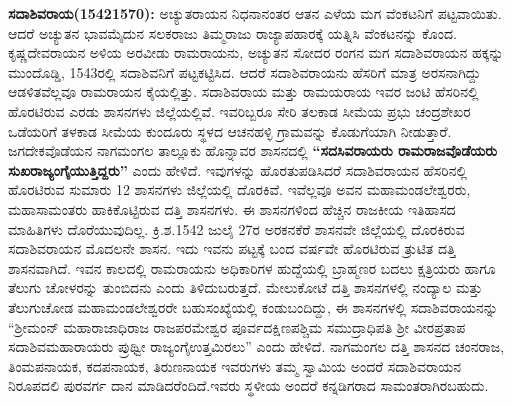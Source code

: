 \textbf{ಸದಾಶಿವರಾಯ(1542\general{\enginline{-}}1570):} ಅಚ್ಯುತರಾಯನ ನಿಧನಾನಂತರ ಆತನ ಎಳೆಯ ಮಗ ವೆಂಕಟನಿಗೆ ಪಟ್ಟವಾಯಿತು. ಆದರೆ ಅಚ್ಯುತನ ಭಾವಮೈದುನ ಸಲಕರಾಜು ತಿಮ್ಮರಾಜು ರಾಜ್ಯಾಪಹಾರಕ್ಕೆ ಯತ್ನಿಸಿ ವೆಂಕಟನನ್ನು ಕೊಂದ. ಕೃಷ್ಣದೇವರಾಯನ ಅಳಿಯ ಅರವೀಡು ರಾಮರಾಯನು, ಅಚ್ಯುತನ ಸೋದರ ರಂಗನ ಮಗ ಸದಾಶಿವರಾಯನ ಹಕ್ಕನ್ನು ಮುಂದೊಡ್ಡಿ, 1543ರಲ್ಲಿ ಸದಾಶಿವನಿಗೆ ಪಟ್ಟಕಟ್ಟಿಸಿದ. ಆದರೆ ಸದಾಶಿವರಾಯನು ಹೆಸರಿಗೆ ಮಾತ್ರ ಅರಸನಾಗಿದ್ದು ಆಡಳಿತವೆಲ್ಲವೂ ರಾಮರಾಯನ ಕೈಯಲ್ಲಿತ್ತು. ಸದಾಶಿವರಾಯ ಮತ್ತು ರಾಮಯರಾಯ ಇವರ ಜಂಟಿ ಹೆಸರಿನಲ್ಲಿ ಹೊರಟಿರುವ ಎರಡು ಶಾಸನಗಳು ಜಿಲ್ಲೆಯಲ್ಲಿವೆ. ಇವರಿಬ್ಬರೂ ಸೇರಿ ತಲಕಾಡ ಸೀಮೆಯ ಪ್ರಭು ಚಂದ್ರಶೇಖರ ಒಡೆಯರಿಗೆ ತಳಕಾಡ ಸೀಮೆಯ ಕುಂದೂರು ಸ್ಥಳದ ಆಚನಹಳ್ಳಿ ಗ್ರಾಮವನ್ನು ಕೊಡುಗೆಯಾಗಿ ನೀಡುತ್ತಾರೆ. ಜಗದೇಕವೊಡೆಯನ ನಾಗಮಂಗಲ ತಾಲ್ಲೂಕು ಹೊನ್ನಾವರ ಶಾಸನದಲ್ಲಿ \textbf{“ಸದಸಿವರಾಯರು ರಾಮರಾಜವೊಡೆಯರು ಸುಖರಾಜ್ಯಂಗೈಯುತ್ತಿದ್ದರು” }ಎಂದು ಹೇಳಿದೆ. ಇವುಗಳನ್ನು ಹೊರತುಪಡಿಸಿದರೆ ಸದಾಶಿವರಾಯನ ಹೆಸರಿನಲ್ಲಿ ಹೊರಟಿರುವ ಸುಮಾರು 12 ಶಾಸನಗಳು ಜಿಲ್ಲೆಯಲ್ಲಿ ದೊರಕಿವೆ. ಇವೆಲ್ಲವೂ ಅವನ ಮಹಾಮಂಡಲೇಶ್ವರರು, ಮಹಾಸಾಮಂತರು ಹಾಕಿಕೊಟ್ಟಿರುವ ದತ್ತಿ ಶಾಸನಗಳು. ಈ ಶಾಸನಗಳಿಂದ ಹೆಚ್ಚಿನ ರಾಜಕೀಯ ಇತಿಹಾಸದ ಮಾಹಿತಿಗಳು ದೊರೆಯುವುದಿಲ್ಲ. ಕ್ರಿ.ಶ.1542 ಜುಲೈ 27ರ ಅರಕನಕೆರೆ ಶಾಸನವೇ ಜಿಲ್ಲೆಯಲ್ಲಿ ದೊರಕಿರುವ ಸದಾಶಿವರಾಯನ ಮೊದಲನೇ ಶಾಸನ. ಇದು ಇವನು ಪಟ್ಟಕ್ಕೆ ಬಂದ ವರ್ಷವೇ ಹೊರಟಿರುವ ತ್ರುಟಿತ ದತ್ತಿ ಶಾಸನವಾಗಿದೆ. ಇವನ ಕಾಲದಲ್ಲಿ ರಾಮರಾಯನು ಅಧಿಕಾರಿಗಳ ಹುದ್ದೆಯಲ್ಲಿ ಬ್ರಾಹ್ಮಣರ ಬದಲು ಕ್ಷತ್ರಿಯರು ಹಾಗೂ ತೆಲುಗು ಚೋಳರನ್ನು ತುಂಬಿದನು ಎಂದು ತಿಳಿದುಬರುತ್ತದೆ. ಮೇಲುಕೋಟೆ ದತ್ತಿ ಶಾಸನಗಳಲ್ಲಿ ನಂದ್ಯಾಲ ಮತ್ತು ತೆಲುಗುಚೋಡ ಮಹಾಮಂಡಲೇಶ್ವರರೇ ಬಹುಸಂಖ್ಯೆಯಲ್ಲಿ ಕಂಡುಬಂದಿದ್ದು, ಈ ಶಾಸನಗಳಲ್ಲಿ ಸದಾಶಿವರಾಯನನ್ನು “ಶ‍್ರೀಮಂನ್​ ಮಹಾರಾಜಾಧಿರಾಜ ರಾಜಪರಮೇಶ್ವರ ಪೂರ್ವದಕ್ಷಿಣಪಶ್ಚಿಮ ಸಮುದ್ರಾಧಿಪತಿ ಶ‍್ರೀ ವೀರಪ್ರತಾಪ ಸದಾಶಿವಮಹಾರಾಯರು ಪ್ರುಥ್ವೀ ರಾಜ್ಯಂಗೈಉತ್ತಮಿರಲು” ಎಂದು ಹೇಳಿದೆ. ನಾಗಮಂಗಲ ದತ್ತಿ ಶಾಸನದ ಚಂನರಾಜ, ತಿಂಮಪನಾಯಕ, ಕದಪನಾಯಕ, ತಿರುಣನಾಯಕ ಇವರುಗಳು ತಮ್ಮ ಸ್ವಾಮಿಯ ಅಂದರೆ ಸದಾಶಿವರಾಯನ ನಿರೂಪದಲಿ ಪುರವರ್ಗ ದಾನ ಮಾಡಿದರೆಂದಿದೆ.ಇವರು ಸ್ಥಳೀಯ ಅಂದರೆ ಕನ್ನಡಿಗರಾದ ಸಾಮಂತರಾಗಿರಬಹುದು.

